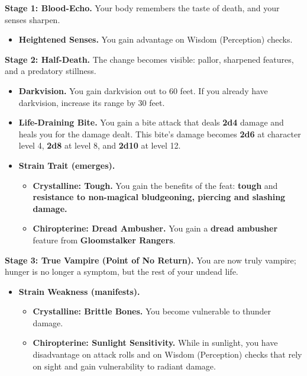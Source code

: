 \documentclass{apotheosis-book}
\begin{document}
\medskip

\textbf{Stage 1: Blood-Echo.}
Your body remembers the taste of death, and your senses sharpen.
\begin{itemize}
\item \textbf{Heightened Senses.} You gain advantage on Wisdom (Perception) checks.
\end{itemize}

\textbf{Stage 2: Half-Death.}
The change becomes visible: pallor, sharpened features, and a predatory stillness.
\begin{itemize}
\item \textbf{Darkvision.} You gain darkvision out to 60 feet. If you already have darkvision, increase its range by 30 feet.
\item \textbf{Life-Draining Bite.} You gain a bite attack that deals \textbf{2d4} damage and heals you for the damage dealt. This bite's damage becomes \textbf{2d6} at character level 4, \textbf{2d8} at level 8, and \textbf{2d10} at level 12.
\item \textbf{Strain Trait (emerges).}
\begin{itemize}
\item \textbf{Crystalline: Tough.} You gain the benefits of the feat: \textbf{tough} and \textbf{resistance to non-magical bludgeoning, piercing and slashing damage.}
\item \textbf{Chiropterine: Dread Ambusher.} You gain a \textbf{dread ambusher} feature from \textbf{Gloomstalker Rangers}.
\end{itemize}
\end{itemize}

\textbf{Stage 3: True Vampire (Point of No Return).}
You are now truly vampire; hunger is no longer a symptom, but the rest of your undead life.
\begin{itemize}
\item \textbf{Strain Weakness (manifests).}
\begin{itemize}
\item \textbf{Crystalline: Brittle Bones.} You become vulnerable to thunder damage.
\item \textbf{Chiropterine: Sunlight Sensitivity.} While in sunlight, you have disadvantage on attack rolls and on Wisdom (Perception) checks that rely on sight and gain vulnerability to radiant damage.
\end{itemize}
\end{itemize}
\end{document}
